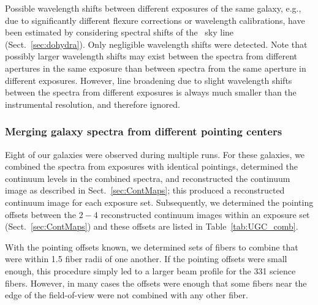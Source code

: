 \documentclass[traditabstract]{aa} %
\begin{document}
Possible wavelength shifts between different exposures of the same galaxy, e.g.,
due to significantly different flexure corrections or wavelength calibrations,
have been estimated by considering spectral shifts of the \none\ sky line
(Sect.~\ref{sec:dohydra}).  Only negligible wavelength shifts were detected.
Note that possibly larger wavelength shifts may exist between the spectra from
different apertures in the same exposure than between spectra from the same
aperture in different exposures.  However, line broadening due to slight
wavelength shifts between the spectra from different exposures is always much
smaller than the instrumental resolution, and therefore ignored.


\subsubsection{Merging galaxy spectra from different pointing centers}
\label{sec:merging}

Eight of our galaxies were observed during multiple runs. For these galaxies, we
combined the spectra from exposures with identical pointings, determined the
continuum levels in the combined spectra, and reconstructed the continuum image
as described in Sect.~\ref{sec:ContMaps}; this produced a reconstructed
continuum image for each exposure set. Subsequently, we determined the pointing
offsets between the $2-4$ reconstructed continuum images within an exposure set
(Sect.~\ref{sec:ContMaps}) and these offsets are listed in Table~\ref{tab:UGC_comb}.

With the pointing offsets known, we determined sets of fibers to combine that
were within 1.5 fiber radii of one another.  If the pointing offsets were small
enough, this procedure simply led to a larger beam profile for the 331 science
fibers.  However, in many cases the offsets were enough that some fibers near
the edge of the field-of-view were not combined with any other fiber.


\end{document}
